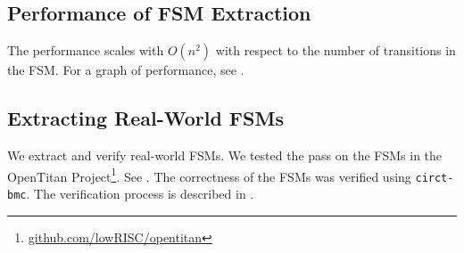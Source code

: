 \documentclass[acmsmall,screen,review]{acmart}
\begin{document}


\subsection{Performance of FSM Extraction}
The performance scales with $O(n^2)$ with respect to the number of transitions in the FSM.
For a graph of performance, see .

\subsection{Extracting Real-World FSMs}

We extract and verify real-world FSMs. We tested the pass on the FSMs in the OpenTitan Project\footnote{\href{https://github.com/lowRISC/opentitan?tab=readme-ov-file}{github.com/lowRISC/opentitan}}.
See .
The correctness of the FSMs was verified using \texttt{circt-bmc}.
The verification process is described in .

\end{document}
